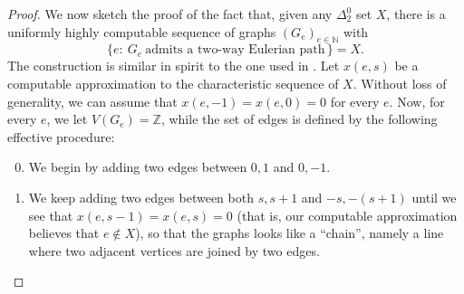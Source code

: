 \documentclass[10pt,A4]{amsart}
\theoremstyle{definition}
\theoremstyle{definition}
\newcommand{\N}{\mathbb{N}}
\newcommand{\Z}{\mathbb{Z}}
\newcommand{\vir}[1]{``#1''}
\begin{document}
\begin{proof}
     We now sketch the proof of the fact that, given any $\Delta_2^0$ set $X$, there is a uniformly highly computable sequence of graphs $(G_e)_{e \in \N}$ with 
     \[\{e: \ G_e \ \text{admits a two-way Eulerian path} \, \}=X.\] The construction is similar in spirit to the one used in . Let $x(e,s)$ be a computable approximation to the characteristic sequence of $X$. Without loss of generality, we can assume that $x(e,-1)=x(e,0)=0$ for every $e$. Now, for every $e$, we let $V(G_e) = \Z$, while the set of edges is defined by the following effective procedure:
     \begin{enumerate}
    \setcounter{enumi}{-1}
        \item We begin by adding two edges between $0, 1$ and $0, -1$. 
        \item We keep adding two edges between both $s, s+1$ and $-s, -(s+1)$ until we see that $x(e,s-1)=x(e,s)=0$ (that is, our computable approximation believes that $e \notin X$), so that the graphs looks like a \vir{chain}, namely a line where two adjacent vertices are joined by two edges.
    \end{enumerate}
    \begin{tcolorbox}
        \begin{center}
\end{center}
\end{tcolorbox}
\end{proof}
\end{document}

